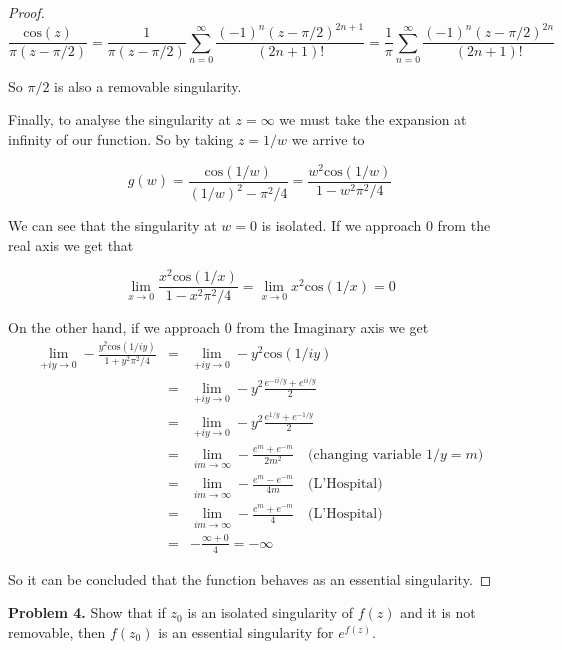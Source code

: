 \documentclass[letterpaper,twoside,11pt]{article}
\begin{document}
\begin{proof}
\begin{equation}
\frac{\text{cos}(z)}{\pi(z-\pi/2)}= \frac{1}{\pi(z-\pi/2)}\sum_{n=0}^{\infty}\frac{(-1)^n(z-\pi/2)^{2n+1}}{(2n+1)!}=\frac{1}{\pi}\sum_{n=0}^{\infty}\frac{(-1)^n(z-\pi/2)^{2n}}{(2n+1)!}\nonumber
\end{equation}

So $\pi/2$ is also a removable singularity.

Finally, to analyse the singularity at $z=\infty$ we must take the expansion at infinity of our function. So by taking $z=1/w$ we arrive to

\begin{equation}
g(w)=\frac{\text{cos}(1/w)}{(1/w)^2-\pi^2/4} = \frac{w^2\text{cos}(1/w)}{1-w^2\pi^2/4}\nonumber
\end{equation}

We can see that the singularity at $w=0$ is isolated. If we approach 0 from the real axis we get that

\begin{equation}
\lim_{x \to 0} \frac{x^2\text{cos}(1/x)}{1-x^2\pi^2/4}= \lim_{x \to 0} x^2\text{cos}(1/x) = 0\nonumber  
\end{equation}

On the other hand, if we approach 0 from the Imaginary axis we get
\begin{eqnarray}
\lim_{+iy \to 0} -\frac{y^2\text{cos}(1/iy)}{1+y^2\pi^2/4}&=& \lim_{+iy \to 0} -y^2\text{cos}(1/iy) \nonumber
\\&=& \lim_{+iy \to 0} -y^2\frac{e^{-ii/y}+e^{ii/y}}{2} \nonumber
\\&=& \lim_{+iy \to 0} -y^2\frac{e^{1/y}+e^{-1/y}}{2} \nonumber
\\&=& \lim_{im \to \infty} -\frac{e^{m}+e^{-m}}{2m^2}\quad\text{(changing variable $1/y=m$)}\nonumber
\\&=& \lim_{im \to \infty} -\frac{e^{m}-e^{-m}}{4m} \quad\text{(L'Hospital)}\nonumber
\\&=&  \lim_{im \to \infty} -\frac{e^{m}+e^{-m}}{4} \quad\text{(L'Hospital)}\nonumber
\\&=& -\frac{\infty+0}{4}=-\infty \nonumber
\end{eqnarray}

So it can be concluded that the function behaves as an essential singularity.
\end{proof}

\newpage
\textbf{Problem 4.} Show that if $z_0$ is an isolated singularity of $f(z)$ and it is not removable, then $f(z_0)$ is an essential singularity for $e^{f(z)}$.
\end{document}

